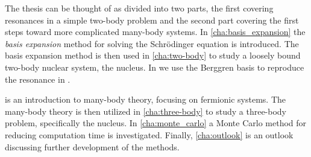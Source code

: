 \documentclass[../main/report.tex]{subfiles}
\begin{document}
The thesis can be thought of as divided into two parts, the first covering resonances in a simple two-body problem and the second part covering the first steps toward more complicated many-body systems. 
In \cref{cha:basis_expansion} the \emph{basis expansion} method for solving the Schrödinger equation is introduced.
The basis expansion method is then used in \cref{cha:two-body} to study a loosely bound two-body nuclear system, the  nucleus.
In  we use the Berggren basis to reproduce the resonance in .

 is an introduction to many-body theory, focusing on fermionic systems. 
The many-body theory is then utilized in \cref{cha:three-body} 
to study a three-body problem, specifically the  nucleus.  
In \cref{cha:monte_carlo} a Monte Carlo method for reducing computation time is investigated. 
Finally, \cref{cha:outlook} is an outlook discussing further development of the methods.
\end{document}
